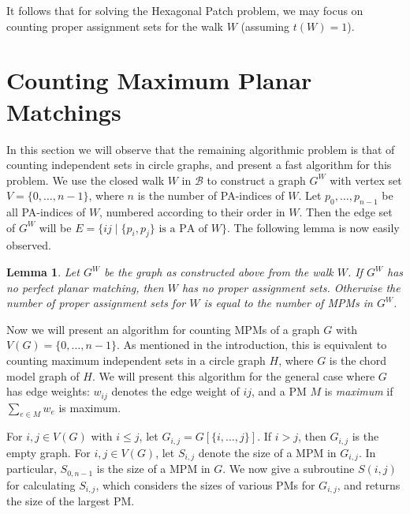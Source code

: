 \documentclass{llncs}
\def\notat#1{{$#1$}\marginpar{\raggedright{\small $#1$}}}
\newcommand{\BW}{\mathcal{B}}
\newcommand{\GPA}{G^{W}}
\newtheorem{lem}[thm]{Lemma}
\begin{document}
It follows that for solving the Hexagonal Patch problem, we may focus on counting proper assignment sets for the walk $W$ (assuming $t(W)=1$).

\section{Counting Maximum Planar Matchings}
\label{sec:circlegraphs}


In this section we will observe that the remaining algorithmic problem is that of counting independent sets in circle graphs, and present a fast algorithm for this problem.
We use the closed walk $W$ in $\BW$ to construct a graph
$\GPA$ with vertex set $V=\{0,\ldots,n-1\}$, where $n$ is the number of PA-indices of $W$. Let $p_0,\ldots,p_{n-1}$ be all PA-indices of $W$, numbered according to their order in $W$. Then the edge set of $\GPA$ will be
$E=\{ij\mid \{p_i,p_j\} \mbox{ is a PA of }W\}$.
The following lemma is now easily observed.

\begin{lem}
\label{lem:equiv_to_MPM}
Let $\GPA$ be the graph as constructed above from the walk $W$.
If $\GPA$ has no perfect planar matching, then $W$ has no proper assignment sets. Otherwise the number of proper assignment sets for $W$ is equal to the number of MPMs in $\GPA$.
\end{lem}



Now we will present an algorithm for counting MPMs of a graph $G$ with $V(G)=\{0,\ldots,n-1\}$. As mentioned in the introduction, this is equivalent to counting maximum independent sets in a circle graph $H$, where $G$ is the chord model graph of $H$.
We will present this algorithm for the general case where $G$ has edge weights: $w_{ij}$ denotes the edge weight of $ij$, and a PM $M$ is {\em maximum} if $\sum_{e\in M} w_e$ is maximum.

For $i,j\in V(G)$ with $i\leq j$, let \notat{G_{i,j}}$=G\left[ \{i,\ldots,j\} \right]$.
If $i>j$, then $G_{i,j}$ is the empty graph.
For $i,j\in V(G)$, let \notat{S_{i,j}} denote the size of a MPM in $G_{i,j}$. In particular, $S_{0,n-1}$ is the size of a MPM in $G$.
We now give a subroutine $S(i,j)$ for calculating $S_{i,j}$, which considers the sizes of various PMs for $G_{i,j}$, and returns the size of the largest PM. 
\end{document}
